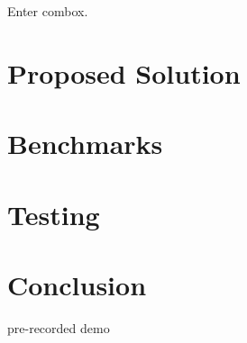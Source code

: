 \documentclass[17pt]{beamer}
\begin{document}
\begin{frame}
  \centering
  Enter combox.
\end{frame}

\section{Proposed Solution}
\section{Benchmarks}
\section{Testing}
\section{Conclusion}

\begin{frame}
  \centering pre-recorded demo
\end{frame}
\end{document}
